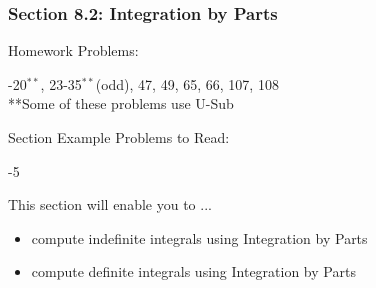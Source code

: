 %
%

\begin{frame}
\frametitle{\Large {\color[rgb]{0.02,0.20,1.0} Section 8.2: Integration by Parts}}
\scriptsize
\vspace{0.8cm}
\begin{block}{Homework Problems:}

\vspace{0.2cm}
-20$^{**}$, 23-35$^{**}$(odd), 47, 49, 65, 66, 107, 108 \,\, \\
\vspace{0.2cm}
**Some of these problems use U-Sub
	
\end{block}
\vspace{0.2cm}

\begin{block}{Section Example Problems to Read:}

\vspace{0.2cm}
-5
	
\end{block}
\vspace{0.5cm}

\begin{block}{This section will enable you to ...}
\begin{itemize}
	\item[...] compute indefinite integrals using Integration by Parts
	\item[...] compute definite integrals using Integration by Parts
\end{itemize}
\end{block}
\vspace{3.0cm}
\end{frame}

